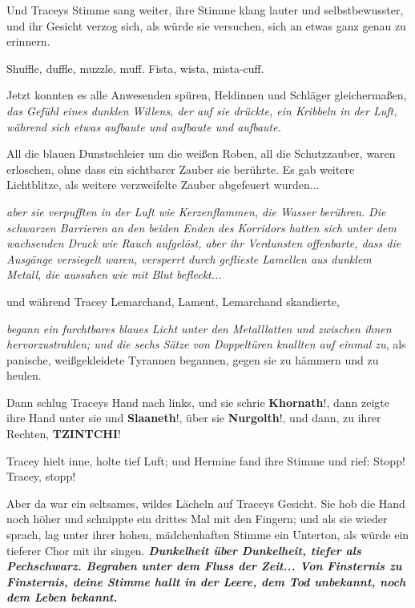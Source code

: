 Und Traceys Stimme sang weiter, ihre Stimme klang lauter und selbstbewusster,
und ihr Gesicht verzog sich, als würde sie versuchen, sich an etwas ganz genau
zu erinnern.

\glqq{}Shuffle, duffle, muzzle, muff. Fista, wista, mista-cuff.\grqq{}

Jetzt konnten es alle Anwesenden spüren, Heldinnen und Schläger gleichermaßen,
\emph{das Gefühl eines dunklen Willens, der auf sie drückte, ein Kribbeln in der
Luft, während sich etwas aufbaute und aufbaute und aufbaute.}

All die blauen Dunstschleier um die weißen Roben, all die Schutzzauber, waren
erloschen, ohne dass ein sichtbarer Zauber sie berührte. Es gab weitere
Lichtblitze, als weitere verzweifelte Zauber abgefeuert wurden...

\emph{aber sie verpufften in der Luft wie Kerzenflammen, die Wasser berühren.}
\emph{Die schwarzen Barrieren an den beiden Enden des Korridors hatten sich
unter dem wachsenden Druck wie Rauch aufgelöst, aber ihr Verdunsten offenbarte,
dass die} \emph{Ausgänge versiegelt waren, versperrt durch geflieste Lamellen
aus dunklem Metall, die aussahen wie mit Blut befleckt...}

und während Tracey \glqq{}Lemarchand, Lament, Lemarchand\grqq{} skandierte,

\emph{begann ein furchtbares blaues Licht unter den Metalllatten und zwischen
ihnen hervorzustrahlen; und die sechs Sätze von Doppeltüren knallten auf einmal
zu}, als panische, weißgekleidete Tyrannen begannen, gegen sie zu hämmern und zu
heulen.

Dann schlug Traceys Hand nach links, und sie schrie \glqq{}
\textbf{Khornath}!\grqq{}, dann zeigte ihre Hand unter sie und \glqq{}
\textbf{Slaaneth}!\grqq{}, über sie \glqq{}\textbf{Nurgolth}!\grqq{}, und dann,
zu ihrer Rechten, \glqq{}\textbf{TZINTCHI}!\grqq{}

Tracey hielt inne, holte tief Luft; und Hermine fand ihre Stimme und rief: \glqq{}
Stopp! Tracey, stopp!\grqq{}

Aber da war ein seltsames, wildes Lächeln auf Traceys Gesicht. Sie hob die Hand
noch höher und schnippte ein drittes Mal mit den Fingern; und als sie wieder
sprach, lag unter ihrer hohen, mädchenhaften Stimme ein Unterton, als würde ein
tieferer Chor mit ihr singen. \glqq{}\textbf{\emph{Dunkelheit über Dunkelheit,
tiefer als Pechschwarz. Begraben unter dem Fluss der Zeit... Von Finsternis zu
Finsternis, deine Stimme hallt in der Leere, dem Tod unbekannt, noch dem Leben
bekannt.}}\grqq{}

